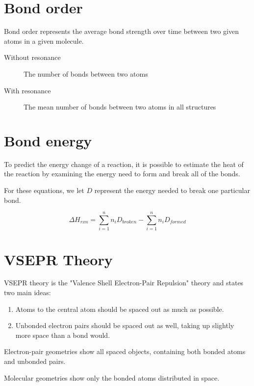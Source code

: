 \section{Bond order}
Bond order represents the average bond strength over time between two given
atoms in a given molecule.

\begin{description}
  \item[Without resonance] The number of bonds between two atoms
  \item[With resonance] The mean number of bonds between two atoms in all
    structures
\end{description}

\section{Bond energy}
To predict the energy change of a reaction, it is possible to estimate the heat
of the reaction by examining the energy need to form and break all of the bonds.

For these equations, we let $D$ represent the energy needed to break one
particular bond.

\begin{equation}
  \Delta H_{rxn} = \sum_{i=1}^{n} n_iD_{broken} - \sum_{i=1}^{n} n_iD_{formed}
\end{equation}

\section{VSEPR Theory}
VSEPR theory is the "Valence Shell Electron-Pair Repulsion" theory and states
two main ideas:

\begin{enumerate}
  \item Atoms to the central atom should be spaced out as much as possible.
  \item Unbonded electron pairs should be spaced out as well, taking up slightly
    more space than a bond would.
\end{enumerate}

Electron-pair geometries show all spaced objects, containing both bonded atoms
and unbonded pairs.

Molecular geometries show only the bonded atoms distributed in space.

